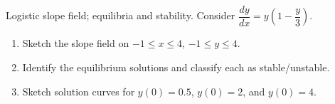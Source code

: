 \documentclass[11pt]{article}
\def\textbf#1{#1}%
\newcounter{question}
\begin{document}
\begin{question}
\textbf{Logistic slope field; equilibria and stability.}
Consider $\dfrac{dy}{dx}=y\!\left(1-\dfrac{y}{3}\right)$.
\begin{enumerate}
  \item Sketch the slope field on $-1\le x\le 4$, $-1\le y\le 4$.
  \item Identify the equilibrium solutions and classify each as stable/unstable.
  \item Sketch solution curves for $y(0)=0.5$, $y(0)=2$, and $y(0)=4$.
\end{enumerate}

\begin{center}
\end{center}
\end{question}
\end{document}
